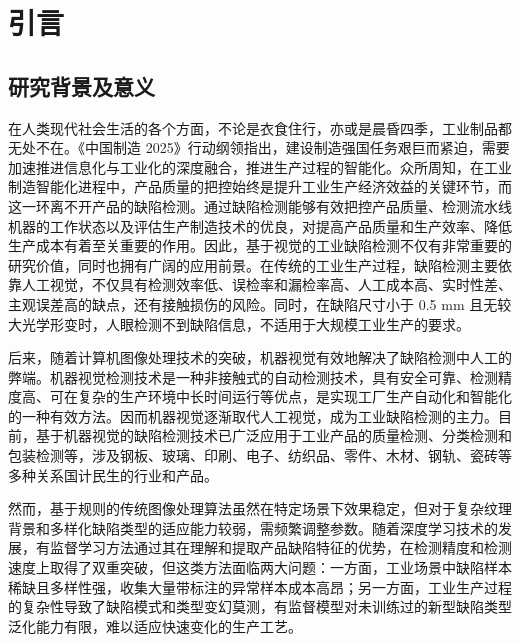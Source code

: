 \documentclass[
  ]{njuthesis}
\begin{document}
\tableofcontents

\mainmatter

\chapter{引言}

\section{研究背景及意义}

在人类现代社会生活的各个方面，不论是衣食住行，亦或是晨昏四季，工业制品都无处不在。《中国制造 2025》行动纲领指出，建设制造强国任务艰巨而紧迫，需要加速推进信息化与工业化的深度融合，推进生产过程的智能化\cite{preskill2018}。众所周知，在工业制造智能化进程中，产品质量的把控始终是提升工业生产经济效益的关键环节，而这一环离不开产品的缺陷检测。通过缺陷检测能够有效把控产品质量、检测流水线机器的工作状态以及评估生产制造技术的优良，对提高产品质量和生产效率、降低生产成本有着至关重要的作用。因此，基于视觉的工业缺陷检测不仅有非常重要的研究价值，同时也拥有广阔的应用前景。在传统的工业生产过程，缺陷检测主要依靠人工视觉，不仅具有检测效率低、误检率和漏检率高、人工成本高、实时性差、主观误差高的缺点，还有接触损伤的风险。同时，在缺陷尺寸小于 0.5 mm 且无较大光学形变时，人眼检测不到缺陷信息，不适用于大规模工业生产的要求。

后来，随着计算机图像处理技术的突破，机器视觉有效地解决了缺陷检测中人工的弊端。机器视觉检测技术是一种非接触式的自动检测技术，具有安全可靠、检测精度高、可在复杂的生产环境中长时间运行等优点，是实现工厂生产自动化和智能化的一种有效方法。因而机器视觉逐渐取代人工视觉，成为工业缺陷检测的主力。目前，基于机器视觉的缺陷检测技术已广泛应用于工业产品的质量检测、分类检测和包装检测等，涉及钢板、玻璃、印刷、电子、纺织品、零件、木材、钢轨、瓷砖等多种关系国计民生的行业和产品。

然而，基于规则的传统图像处理算法虽然在特定场景下效果稳定，但对于复杂纹理背景和多样化缺陷类型的适应能力较弱，需频繁调整参数。随着深度学习技术的发展，有监督学习方法通过其在理解和提取产品缺陷特征的优势，在检测精度和检测速度上取得了双重突破，但这类方法面临两大问题：一方面，工业场景中缺陷样本稀缺且多样性强，收集大量带标注的异常样本成本高昂；另一方面，工业生产过程的复杂性导致了缺陷模式和类型变幻莫测，有监督模型对未训练过的新型缺陷类型泛化能力有限，难以适应快速变化的生产工艺。
\end{document}
